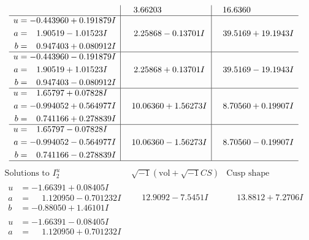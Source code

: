 \documentclass[1p]{elsarticle_modified}
\theoremstyle{definition}
\newcommand{\I}{\sqrt{-1}}
\begin{document}
$$\begin{array}{c|c|c}
 & \phantom{-}3.66203\phantom{ +0.000000I} & \phantom{-}16.6360\phantom{ +0.000000I} \\ \hline\begin{aligned}
u &= -0.443960 + 0.191879 I \\
a &= \phantom{-}1.90519 - 1.01523 I \\
b &= \phantom{-}0.947403 + 0.080912 I\end{aligned}
 & \phantom{-}2.25868 - 0.13701 I & \phantom{-}39.5169 + 19.1943 I \\ \hline\begin{aligned}
u &= -0.443960 - 0.191879 I \\
a &= \phantom{-}1.90519 + 1.01523 I \\
b &= \phantom{-}0.947403 - 0.080912 I\end{aligned}
 & \phantom{-}2.25868 + 0.13701 I & \phantom{-}39.5169 - 19.1943 I \\ \hline\begin{aligned}
u &= \phantom{-}1.65797 + 0.07828 I \\
a &= -0.994052 + 0.564977 I \\
b &= \phantom{-}0.741166 + 0.278839 I\end{aligned}
 & \phantom{-}10.06360 + 1.56273 I & \phantom{-}8.70560 + 0.19907 I \\ \hline\begin{aligned}
u &= \phantom{-}1.65797 - 0.07828 I \\
a &= -0.994052 - 0.564977 I \\
b &= \phantom{-}0.741166 - 0.278839 I\end{aligned}
 & \phantom{-}10.06360 - 1.56273 I & \phantom{-}8.70560 - 0.19907 I\\
 \hline 
 \end{array}$$\newpage$$\begin{array}{c|c|c}  
\text{Solutions to }I^u_{2}& \I (\text{vol} + \sqrt{-1}CS) & \text{Cusp shape}\\
 \hline 
\begin{aligned}
u &= -1.66391 + 0.08405 I \\
a &= \phantom{-}1.120950 - 0.701232 I \\
b &= -0.88050 + 1.46101 I\end{aligned}
 & \phantom{-}12.9092 - 7.5451 I & \phantom{-}13.8812 + 7.2706 I \\ \hline\begin{aligned}
u &= -1.66391 - 0.08405 I \\
a &= \phantom{-}1.120950 + 0.701232 I \\

\end{aligned}
\end{array}$$
\end{document}
